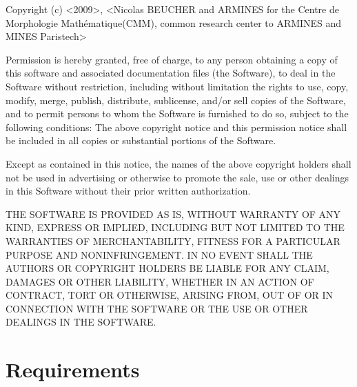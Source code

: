 \documentclass[a4paper,10pt,oneside]{article}
\begin{document}
\begin{minipage}[c]{0.8\textwidth}%
 {\small Copyright (c) <2009>, <Nicolas BEUCHER and ARMINES for the Centre de 
 Morphologie Math\'{e}matique(CMM), common research center to ARMINES and MINES 
 Paristech>}{\small \vspace{0.5cm} \par}

{\small Permission is hereby granted, free of charge, to any person
obtaining a copy of this software and associated documentation files
(the \textquotedbl{}Software\textquotedbl{}), to deal in the Software
without restriction, including without limitation the rights to use,
copy, modify, merge, publish, distribute, sublicense, and/or sell
copies of the Software, and to permit persons to whom the Software
is furnished to do so, subject to the following conditions: The above
copyright notice and this permission notice shall be included in all
copies or substantial portions of the Software.}{\small \vspace{0.5cm} \par}

{\small Except as contained in this notice, the names of the above copyright 
holders shall not be used in advertising or otherwise to promote the sale, use 
or other dealings in this Software without their prior written authorization.}
{\small \vspace{0.5cm} \par}

{\small THE SOFTWARE IS PROVIDED \textquotedbl{}AS IS\textquotedbl{},
WITHOUT WARRANTY OF ANY KIND, EXPRESS OR IMPLIED, INCLUDING BUT NOT
LIMITED TO THE WARRANTIES OF MERCHANTABILITY, FITNESS FOR A PARTICULAR
PURPOSE AND NONINFRINGEMENT. IN NO EVENT SHALL THE AUTHORS OR COPYRIGHT
HOLDERS BE LIABLE FOR ANY CLAIM, DAMAGES OR OTHER LIABILITY, WHETHER
IN AN ACTION OF CONTRACT, TORT OR OTHERWISE, ARISING FROM, OUT OF
OR IN CONNECTION WITH THE SOFTWARE OR THE USE OR OTHER DEALINGS IN
THE SOFTWARE. }%
\vspace{1cm}
\end{minipage}


\pagebreak

\section{Requirements}
\label{cha:Requirements}
\end{document}

